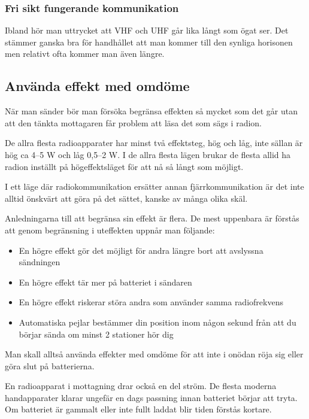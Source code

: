 \documentclass[12ypt,swedish,a4paper]{report}
\begin{document}
\subsubsection{Fri sikt fungerande kommunikation}

Ibland hör man uttrycket att VHF och UHF går lika långt som ögat ser. Det stämmer ganska bra för handhållet att man kommer till den synliga horisonen men relativt ofta kommer man även längre.

\subsection{Använda effekt med omdöme}

När man sänder bör man försöka begränsa effekten så mycket som det går utan att den tänkta mottagaren får problem att läsa det som sägs i radion. 

De allra flesta radioapparater har minst två effektsteg, hög och låg, inte sällan är hög ca 4--5 W och låg 0,5--2 W. I de allra flesta lägen brukar de flesta allid ha radion inställt på högeffektsläget för att nå så långt som möjligt.

I ett läge där radiokommunikation ersätter annan fjärrkommunikation är det inte alltid önskvärt att göra på det sättet, kanske av många olika skäl.

Anledningarna till att begränsa sin effekt är flera. De mest uppenbara är förstås att genom begränsning i uteffekten uppnår man följande:

\begin{itemize}
	\item En högre effekt gör det möjligt för andra längre bort att avslyssna sändningen
	\item En högre effekt tär mer på batteriet i sändaren
	\item En högre effekt riskerar störa andra som använder samma radiofrekvens
	\item Automatiska pejlar bestämmer din position inom någon sekund från att du börjar sända om minst 2 stationer hör dig
\end{itemize}

Man skall alltså använda effekter med omdöme för att inte i onödan röja sig eller göra slut på batterierna.

En radioapparat i mottagning drar också en del ström. De flesta moderna handapparater klarar ungefär en dags passning innan batteriet börjar att tryta. Om batteriet är gammalt eller inte fullt laddat blir tiden förstås kortare.
\end{document}
